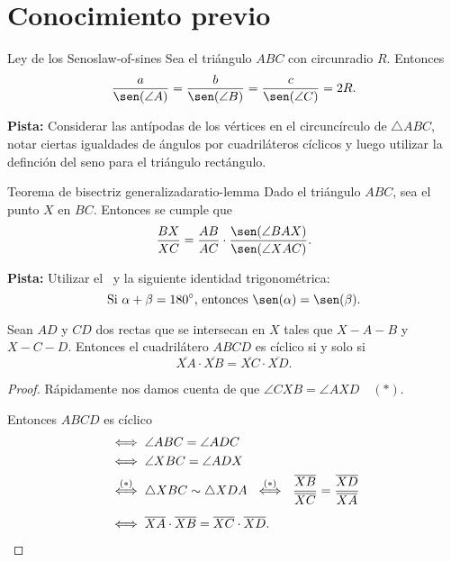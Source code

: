 \newpage
\section{Conocimiento previo}


\begin{section-theorem.tcb}{Ley de los Senos}{law-of-sines}
    Sea el triángulo $ABC$ con circunradio $R$.
    Entonces
    \[
        \frac{a}{\sen(\angle A)} = \frac{b}{\sen(\angle B)} = \frac{c}{\sen(\angle C)} = 2R.
    \]
\end{section-theorem.tcb}

\textbf{Pista:} Considerar las antípodas de los vértices en el circuncírculo de $\triangle ABC$, notar ciertas igualdades de ángulos por cuadriláteros cíclicos y luego utilizar la definción del seno para el triángulo rectángulo.


\begin{section-theorem.tcb}{Teorema de bisectriz generalizada}{ratio-lemma}
    Dado el triángulo $ABC$, sea el punto $X$ en $BC$.
    Entonces se cumple que
    \[
        \frac{BX}{XC} = \frac{AB}{AC} \cdot \frac{\sen(\angle BAX)}{\sen(\angle XAC)}.
    \]
\end{section-theorem.tcb}

\textbf{Pista:} Utilizar el~ y la siguiente identidad trigonométrica:
\[
    \text{Si}\ \alpha + \beta = 180^\circ\text{,}\ \text{entonces}\ \sen(\alpha) = \sen(\beta).
\]

\begin{section-property}\label{power-external-point}
Sean $AD$ y $CD$ dos rectas que se intersecan en $X$ tales que $X - A - B$ y $X - C - D$.
Entonces el cuadrilátero $ABCD$ es cíclico si y solo si
\[
    \overline{XA} \cdot \overline{XB} = \overline{XC} \cdot \overline{XD}.
\]
\end{section-property}

\begin{multicols}{2}
    \begin{proof}
        Rápidamente nos damos cuenta de que $\angle CXB = \angle AXD\quad (\ast).$

        Entonces $ABCD$ es cíclico
        \begin{align*}
            &\iff \angle ABC = \angle ADC\\
            &\iff \angle XBC = \angle ADX\\
            &\overset{(\ast)}{\iff} \triangle XBC \sim \triangle XDA \ \overset{(\ast)}{\iff} \ \frac{\overline{XB}}{\overline{XC}} = \frac{\overline{XD}}{\overline{XA}}\\[2mm]
            &\iff \overline{XA} \cdot \overline{XB} = \overline{XC} \cdot \overline{XD}. \qedhere
        \end{align*}
    \end{proof}
    \begin{figure}[H]
        \centering
        
    \end{figure}
\end{multicols}